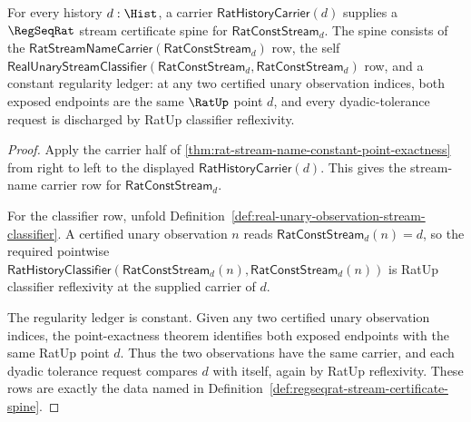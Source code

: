 \begin{theorem}
\label{thm:regseqrat-constant-stream-spine}
For every history $d:\Hist$, a carrier
$\mathsf{RatHistoryCarrier}(d)$ supplies a $\RegSeqRat$ stream certificate spine
for $\mathsf{RatConstStream}_d$. The spine consists of the
$\mathsf{RatStreamNameCarrier}(\mathsf{RatConstStream}_d)$ row, the self
$\mathsf{RealUnaryStreamClassifier}(\mathsf{RatConstStream}_d,
\mathsf{RatConstStream}_d)$ row, and a constant regularity ledger: at any two
certified unary observation indices, both exposed endpoints are the same
$\RatUp$ point $d$, and every dyadic-tolerance request is discharged by RatUp
classifier reflexivity.
\end{theorem}
\begin{proof}
Apply the carrier half of
\autoref{thm:rat-stream-name-constant-point-exactness} from right to left to
the displayed $\mathsf{RatHistoryCarrier}(d)$. This gives the stream-name
carrier row for $\mathsf{RatConstStream}_d$.

For the classifier row, unfold
Definition~\ref{def:real-unary-observation-stream-classifier}. A certified
unary observation $n$ reads
$\mathsf{RatConstStream}_d(n)=d$, so the required pointwise
$\mathsf{RatHistoryClassifier}(\mathsf{RatConstStream}_d(n),
\mathsf{RatConstStream}_d(n))$ is RatUp classifier reflexivity at the supplied
carrier of $d$.

The regularity ledger is constant. Given any two certified unary observation
indices, the point-exactness theorem identifies both exposed endpoints with
the same RatUp point $d$. Thus the two observations have the same carrier, and
each dyadic tolerance request compares $d$ with itself, again by RatUp
reflexivity. These rows are exactly the data named in
Definition~\ref{def:regseqrat-stream-certificate-spine}.
\end{proof}

